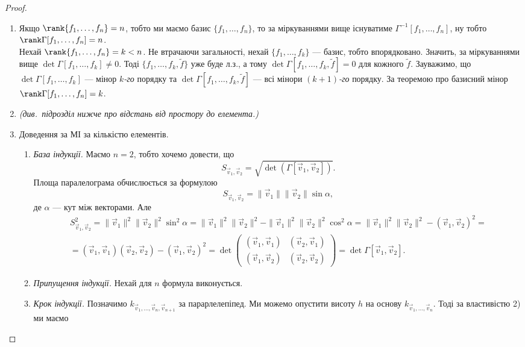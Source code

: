 \documentclass{math_library}
\begin{document}
\begin{proof}
\begin{enumerate}[topsep=0pt, wide=0pt, label={\arabic*)}]
\item Якщо $\rank\{f_1,\dots,f_n\} = n$, тобто ми маємо базис $\{f_1,\dots,f_n\}$, то за міркуваннями вище існуватиме $\Gamma^{-1}[f_1,\dots,f_n]$, ну тобто $\rank\Gamma[f_1,\dots,f_n] = n$.\\
Нехай $\rank\{f_1,\dots,f_n\} = k < n$. Не втрачаючи загальності, нехай $\{f_1,\dots,f_k\}$ --- базис, тобто впорядковано. Значить, за міркуваннями вище $\det \Gamma[f_1,\dots,f_k] \neq 0$. Тоді $\{f_1,\dots,f_k,\widetilde{f}\}$ уже буде л.з., а тому $\det \Gamma[f_1,\dots,f_k,\widetilde{f}] = 0$ для кожного $\tilde{f}$. Зауважимо, що $\det \Gamma[f_1,\dots,f_k]$ --- мінор $k$\textit{-го} порядку та $\det \Gamma[f_1,\dots,f_k, \widetilde{f}]$ --- всі мінори $(k+1)$\textit{-го} порядку. За теоремою про базисний мінор $\rank \Gamma[f_1,\dots,f_n] = k$.
\item \textit{(див.\ підрозділ нижче про відстань від простору до елемента.)}
\item Доведення за МІ за кількістю елементів.
\begin{enumerate}[nosep,wide=0pt,label={\Roman*.}]
\item \textit{База індукції.} Маємо $n = 2$, тобто хочемо довести, що \[
S_{\vec{v}_1,\vec{v}_2} = \sqrt{\det(\Gamma[\vec{v}_1,\vec{v}_2])}.
\]
Площа паралелограма обчислюється за формулою 
\[
S_{\vec{v}_1,\vec{v}_2} = \| \vec{v}_1 \| \| \vec{v}_2 \| \sin \alpha,
\]
де $\alpha$ --- кут між векторами. Але
\begin{align*}
S^2_{\vec{v}_1,\vec{v}_2} = \| \vec{v}_1 \|^2 \| \vec{v}_2 \|^2 \sin^2 \alpha = \| \vec{v}_1 \|^2 \| \vec{v}_2 \|^2 - \| \vec{v}_1 \|^2 \| \vec{v}_2 \|^2 \cos^2 \alpha = \| \vec{v}_1 \|^2 \| \vec{v}_2 \|^2 - (\vec{v}_1,\vec{v}_2)^2 = \\ = (\vec{v}_1,\vec{v}_1) (\vec{v}_2,\vec{v}_2) - (\vec{v}_1,\vec{v}_2)^2 = \det \begin{pmatrix}
(\vec{v}_1,\vec{v}_1) & (\vec{v}_2,\vec{v}_1) \\
(\vec{v}_1,\vec{v}_2) & (\vec{v}_2,\vec{v}_2)
\end{pmatrix} = \det \Gamma[\vec{v}_1,\vec{v}_2].
\end{align*}
\item \textit{Припущення індукції.} Нехай для $n$ формула виконується.
\item \textit{Крок індукції.} Позначимо $k_{\vec{v}_1,\dots,\vec{v}_n,\vec{v}_{n+1}}$ за парарлелепіпед. Ми можемо опустити висоту $h$ на основу $k_{\vec{v}_1,\dots,\vec{v}_n}$. Тоді за властивістю 2) ми маємо 

\end{enumerate}
\end{enumerate}
\end{proof}
\end{document}
